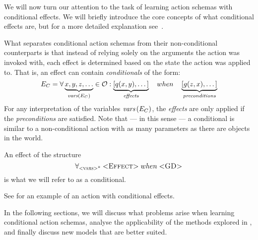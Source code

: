 \documentclass[../Master.tex]{subfiles}
\begin{document}
We will now turn our attention to the task of learning action schemas with conditional effects. 
We will briefly introduce the core concepts of what conditional effects are, but for a more detailed explanation see~. 

What separates conditional action schemas from their non-conditional counterparts is that instead of relying solely on the arguments the action was invoked with, each effect is determined based on the state the action was applied to. That is, an effect can contain \emph{conditionals} of the form:
\begin{equation*}
    E_C = \forall \underbrace{x, y, z, \dots}_{\textit{vars} \left(E_C\right)}\in \mathcal{O} : 
    \underbrace{\left[ q(x, y), \dots \right]}_{\textit{effects}} \quad when \quad 
    \underbrace{\left[ g(z, x), \dots  \right]}_{\textit{preconditions}}
\end{equation*}
For any interpretation of the variables $\textit{vars}\left(E_C\right)$, the \textit{effects} are only applied if the \textit{preconditions} are satisfied. Note that --- in this sense --- a conditional is similar to a non-conditional action with as many parameters as there are objects in the world. 

\begin{definition}[Conditional]
	An effect of the structure 
	\begin{equation}
		\forall_{\textsc{<vars>*}} \; \textsc{<Effect>} \; when \; \textsc{<GD>}
	\end{equation} is what we will refer to as a conditional.
\end{definition}


See  for an example of an action with conditional effects. 

In the following sections, we will discuss what problems arise when learning conditional action schemas, analyse the applicability of the methods explored in , and finally discuss new models that are better suited.
\end{document}
